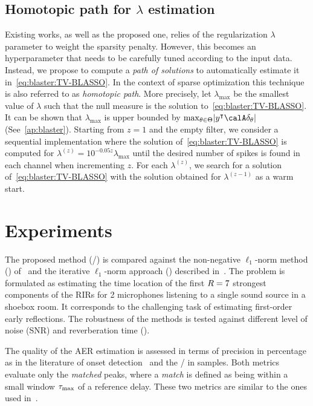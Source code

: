 \subsection{Homotopic path for $\lambda$ estimation}\label{sec:blaster:lambda}
Existing works, as well as the proposed one, relies of the regularization $\lambda$ parameter to weight the sparsity penalty.
However, this becomes an hyperparameter that needs to be carefully tuned according to the input data.
Instead, we propose to compute a \textit{path of solutions} to automatically estimate it in~\cref{eq:blaster:TV-BLASSO}.
In the context of sparse optimization this technique is also referred to as \textit{homotopic path}.
More precisely, let $\lambda_{\max}$ be the smallest value of $\lambda$ such that the null measure is the solution to~\cref{eq:blaster:TV-BLASSO}.
It can be shown that $\lambda_{\max}$ is upper bounded by $\max_{\theta\in\Theta} \kvbar{y^\intercal\opObs\delta_\theta}$ (See~\cref{ap:blaster}).
Starting from $z=1$ and the empty filter, we consider a sequential implementation where the solution of~\cref{eq:blaster:TV-BLASSO} is computed for $\lambda^(z)= 10^{-0.05z}\lambda_{\max}$ until the desired number of spikes is found in each channel when incrementing $z$.
For each $\lambda^(z)$, we search for a solution of~\cref{eq:blaster:TV-BLASSO} with the solution obtained for $\lambda^{(z-1)}$ as a warm start.

\section{Experiments}\label{sec:blaster:exp}
The proposed method (\BLASTER/) is compared against the non-negative $\ell_1$-norm method (\algoBsn) of~ and the iterative $\ell_1$-norm approach (\algoCrocco) described in~.
The problem is formulated as estimating the time location of the first $R=7$ strongest components of the RIRs for 2 microphones listening to a single sound source in a shoebox room. It corresponds to the challenging task of estimating first-order early reflections.
The robustness of the methods is tested against different level of noise (SNR) and reverberation time (\RT{}).

\mynewline
The quality of the AER estimation is assessed in terms of precision
in percentage as in the literature of onset detection~ and the \RMSEtxt/ in samples.
Both metrics evaluate only the \textit{matched} peaks, where a \textit{match} is defined as being within a small window $\tau_\text{max}$ of a reference delay.
These two metrics are similar to the ones used in~.

